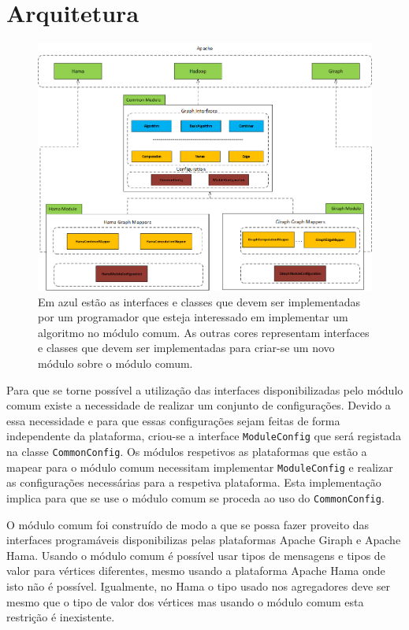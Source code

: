 \chapter{Arquitetura}
\begin{figure}[H]
	\centering
		\includegraphics[width=\linewidth]{arquitetura}
	\caption{Em azul estão as interfaces e classes que devem ser 
	implementadas por um programador que esteja interessado em implementar 
um algoritmo no módulo comum. As outras cores representam interfaces e classes 
que devem ser implementadas para criar-se um novo módulo sobre o módulo comum.}
	\label{fig:arquitetura}
\end{figure}

Para que se torne possível a utilização das interfaces disponibilizadas pelo 
módulo comum existe a necessidade de realizar um conjunto de configurações. 
Devido a essa necessidade e para que essas 
configurações sejam feitas de forma independente da plataforma,
criou-se a interface \texttt{ModuleConfig} que será registada na classe \texttt{CommonConfig}.
Os módulos respetivos as plataformas que estão a mapear para o módulo comum necessitam implementar 
\texttt{ModuleConfig} e realizar as configurações necessárias para a respetiva 
plataforma. Esta implementação implica para que se use o módulo comum se proceda 
ao uso do \texttt{CommonConfig}.

O módulo comum foi construído de modo a que se possa fazer proveito das 
interfaces programáveis disponibilizas pelas plataformas Apache Giraph e Apache 
Hama. Usando o módulo comum é possível usar tipos de mensagens e tipos de valor 
para vértices diferentes, mesmo usando a plataforma Apache Hama onde isto não é 
possível. Igualmente, no Hama o tipo usado nos agregadores deve ser mesmo que o tipo
de valor dos vértices mas usando o módulo comum esta restrição é inexistente.

